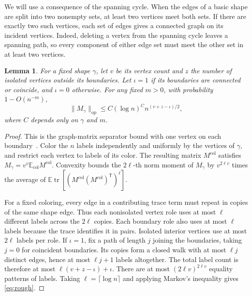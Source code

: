 \documentclass[11pt,letterpaper]{article}
\newtheorem{lemma}{Lemma}[section]
\newcommand{\E}{\mathbb E}
\newcommand{\tr}{\operatorname{tr}}
\newcommand{\norm}[1]{\lVert #1\rVert}
\newcommand{\op}{\mathrm{op}}
\begin{document}
We will use a consequence of the spanning cycle. When the edges of a
basic shape are split into two nonempty sets, at least two vertices
meet both sets. If there are exactly two such vertices, each set of
edges gives a connected graph on its incident vertices. Indeed,
deleting a vertex from the spanning cycle leaves a spanning path, so
every component of either edge set must meet the other set in at least
two vertices.

\begin{lemma}\label{lem:rough}
For a fixed shape \(\gamma\), let \(v\) be its vertex count and \(z\)
the number of isolated vertices outside its boundaries. Let \(\iota=1\) if
its boundaries are connected or coincide, and \(\iota=0\) otherwise. For
any fixed \(m>0\), with probability \(1-O(n^{-m})\),
\begin{equation}\label{eq:rough}
 \norm{M_\gamma}_{\op}\le C(\log n)^C n^{(v+z-\iota)/2},
\end{equation}
where \(C\) depends only on \(\gamma\) and \(m\).
\end{lemma}

\begin{proof}
This is the graph-matrix separator bound with one vertex on each
boundary~\cite{AMP}. Color the \(n\) labels independently and uniformly
by the vertices of \(\gamma\), and restrict each vertex to labels of
its color. The resulting matrix \(M^{\mathrm{col}}\) satisfies
\(M_\gamma=v^v\E_{\mathrm{col}} M^{\mathrm{col}}\). Convexity bounds the
\(2\ell\)-th norm moment of \(M_\gamma\) by \(v^{2\ell v}\) times the
average of \(\E\tr[(M^{\mathrm{col}}(M^{\mathrm{col}})^{\mathsf T})^\ell]\).

For a fixed coloring, every edge in a contributing trace term must
repeat in copies of the same shape edge. Thus each nonisolated vertex
role uses at most \(\ell\) different labels across the \(2\ell\) copies.
Each boundary role also uses at most \(\ell\) labels because the trace
identifies it in pairs. Isolated interior vertices use at most \(2\ell\)
labels per role. If \(\iota=1\), fix a path of length \(j\) joining the
boundaries, taking \(j=0\) for coincident boundaries. Its copies form a
closed walk with at most \(\ell j\) distinct edges, hence at most \(\ell j+1\)
labels altogether. The total label count is therefore at most
\(\ell(v+z-\iota)+\iota\). There are at most \((2\ell v)^{2\ell v}\)
equality patterns of labels. Taking \(\ell=\lceil\log n\rceil\) and
applying Markov's inequality gives \eqref{eq:rough}.
\end{proof}
\end{document}
